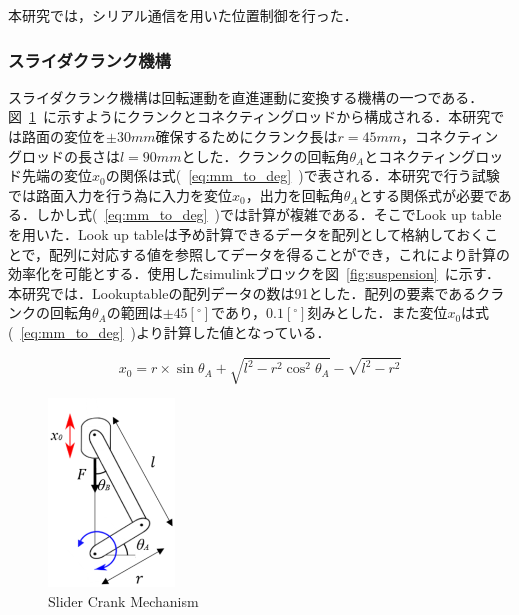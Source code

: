 \documentclass[a4paper,12pt]{article_vdlab_sotsuron}
\begin{document}
\newpage
本研究では，シリアル通信を用いた位置制御を行った．

\newpage
\subsubsection{スライダクランク機構}
スライダクランク機構は回転運動を直進運動に変換する機構の一つである．図~\ref{fig:slider_crank}~に示すようにクランクとコネクティングロッドから構成される．本研究では路面の変位を$\pm 30mm$確保するためにクランク長は$r=45mm$，コネクティングロッドの長さは$l=90mm$とした．クランクの回転角$\theta_A$とコネクティングロッド先端の変位$x_0$の関係は式(~\ref{eq:mm_to_deg}~)で表される．本研究で行う試験では路面入力を行う為に入力を変位$x_0$，出力を回転角$\theta_A$とする関係式が必要である．しかし式(~\ref{eq:mm_to_deg}~)では計算が複雑である．そこでLook up tableを用いた．Look up tableは予め計算できるデータを配列として格納しておくことで，配列に対応する値を参照してデータを得ることができ，これにより計算の効率化を可能とする．使用したsimulinkブロックを図~\ref{fig:suspension}~に示す．本研究では．Lookuptableの配列データの数は91とした．配列の要素であるクランクの回転角$\theta_A$の範囲は$\pm45[^\circ ]$であり，$0.1[^\circ ]$刻みとした．また変位$x_0$は式(~\ref{eq:mm_to_deg}~)より計算した値となっている．

\begin{equation}
 \label{eq:mm_to_deg}
x_{0} =r\times \sin \theta _{A} +\sqrt{l^{2} -r^{2}\cos^{2} \theta _{A}} -\sqrt{l^{2} -r^{2}}
\end{equation}

\vspace*{5mm}
\begin{figure}[htp]
  \begin{center}
    \includegraphics[height=50mm]{figure/slider_crank.eps}
    \vspace*{3mm}
    \caption{Slider Crank Mechanism}
    \label{fig:slider_crank}
  \end{center}
\end{figure}
\end{document}
